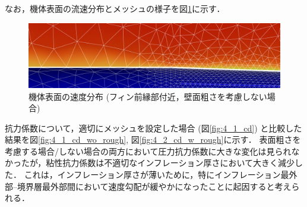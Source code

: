 \documentclass[uplatex,dvipdfmx,a4j,12pt]{jsarticle}
\begin{document}
なお，機体表面の流速分布とメッシュの様子を図\ref{fig:velocity_2}に示す．
\begin{figure}[H]
  \centering
  \includegraphics[width=\linewidth]{wall_function/img/4_2_velocity.png}
  \caption{機体表面の速度分布 (フィン前縁部付近，壁面粗さを考慮しない場合)}
  \label{fig:velocity_2}
\end{figure}

抗力係数について，適切にメッシュを設定した場合 (図\ref{fig:4_1_cd}) と比較した結果を図\ref{fig:4_1_cd_wo_rough}, 図\ref{fig:4_2_cd_w_rough}に示す．
表面粗さを考慮する場合/しない場合の両方において圧力抗力係数に大きな変化は見られなかったが，粘性抗力係数は不適切なインフレーション厚さにおいて大きく減少した．
これは，インフレーション厚さが薄いために，特にインフレーション最外部--境界層最外部間において速度勾配が緩やかになったことに起因すると考えられる．
\end{document}
